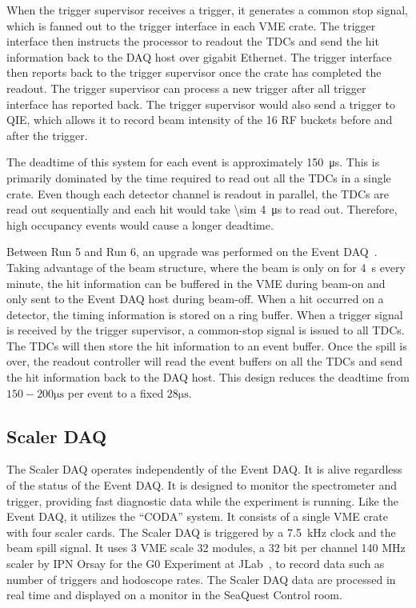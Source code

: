 \documentclass[../main.tex]{subfiles}
\begin{document}
When the trigger supervisor receives a trigger, it generates a common stop signal, which is fanned out
to the trigger interface in each VME crate. The trigger interface then instructs the processor to readout the TDCs
and send the hit information back to the DAQ host over gigabit Ethernet. The trigger interface then
reports back to the trigger supervisor once the crate has completed the readout. The trigger supervisor can process
a new trigger after all trigger interface has reported back. The trigger supervisor would also send a trigger to QIE,
which allows it to record beam intensity of the 16 RF buckets before and after the trigger.

The deadtime of this system for each event is approximately \SI{150}{\micro\second}. This is primarily
dominated by the time required to read out all the TDCs in a single crate. Even though
each detector channel is readout in parallel, the TDCs are read out sequentially
and each hit would take \SI{\sim 4}{\micro\second} to read out. Therefore, high occupancy
events would cause a longer deadtime.

Between Run 5 and Run 6, an upgrade was performed on the Event DAQ~\cite{Kun-1724}.
Taking advantage of the beam structure, where the beam is only on for \SI{4}{\s} every minute,
the hit information can be buffered in the VME during beam-on and only sent to the Event
DAQ host during beam-off. When a hit occurred on a detector,
the timing information is stored on a ring buffer.
When a trigger signal is received by the trigger supervisor,
a common-stop signal is issued to all TDCs. The TDCs will then store the hit information
to an event buffer. Once the spill is over, the readout controller will read the event
buffers on all the TDCs and send the hit information back to the DAQ host.
This design reduces the deadtime from $150 -200\unit{\micro\second}$ per event to a fixed $28\unit{\micro\second}$.

\subsection{Scaler DAQ}
The Scaler DAQ operates independently of the Event DAQ.
It is alive regardless of the status of the Event DAQ.
It is designed to monitor the spectrometer and trigger,
providing fast diagnostic data while the experiment is running. Like the Event DAQ,
it utilizes the ``CODA'' system. It consists of a single VME crate with four scaler
cards. The Scaler DAQ is triggered by a \SI{7.5}{\kilo\hertz} clock and the beam
spill signal. It uses 3 VME scale 32 modules,
a 32 bit per channel 140 MHz scaler by IPN Orsay for the G0 Experiment at JLab~\cite{Scale32},
to record data such as number of triggers
and hodoscope rates. The Scaler DAQ data are processed in real time and displayed
on a monitor in the SeaQuest Control room.
\end{document}
